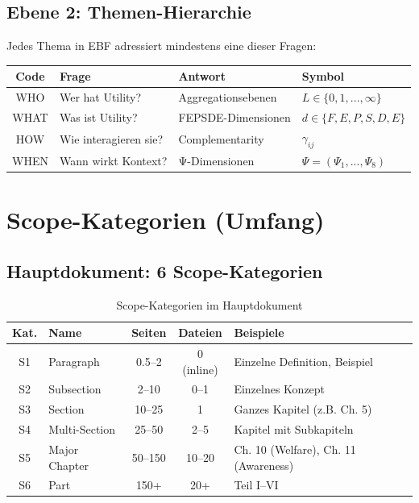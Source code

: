 \documentclass[12pt,a4paper]{article}
\begin{document}
\subsection{Ebene 2: Themen-Hierarchie}

\begin{tcolorbox}[colback=gray!5!white, colframe=gray!75!black, 
    title=Die 4 fundamentalen Fragen]

Jedes Thema in EBF adressiert mindestens eine dieser Fragen:

\begin{center}
\renewcommand{\arraystretch}{1.5}
\begin{tabular}{@{}clll@{}}
\toprule
\textbf{Code} & \textbf{Frage} & \textbf{Antwort} & \textbf{Symbol} \\
\midrule
WHO & Wer hat Utility? & Aggregationsebenen & $L \in \{0,1,...,\infty\}$ \\
WHAT & Was ist Utility? & FEPSDE-Dimensionen & $d \in \{F,E,P,S,D,E\}$ \\
HOW & Wie interagieren sie? & Complementarity & $\gamma_{ij}$ \\
WHEN & Wann wirkt Kontext? & Ψ-Dimensionen & $\Psi = (\Psi_1,...,\Psi_8)$ \\
\bottomrule
\end{tabular}
\end{center}

\end{tcolorbox}

\section{Scope-Kategorien (Umfang)}

\subsection{Hauptdokument: 6 Scope-Kategorien}

\begin{table}[htbp]
\centering
\caption{Scope-Kategorien im Hauptdokument}
\renewcommand{\arraystretch}{1.3}
\begin{tabular}{@{}clccp{5cm}@{}}
\toprule
\textbf{Kat.} & \textbf{Name} & \textbf{Seiten} & \textbf{Dateien} & \textbf{Beispiele} \\
\midrule
S1 & Paragraph & 0.5--2 & 0 (inline) & Einzelne Definition, Beispiel \\
S2 & Subsection & 2--10 & 0--1 & Einzelnes Konzept \\
S3 & Section & 10--25 & 1 & Ganzes Kapitel (z.B. Ch. 5) \\
S4 & Multi-Section & 25--50 & 2--5 & Kapitel mit Subkapiteln \\
S5 & Major Chapter & 50--150 & 10--20 & Ch. 10 (Welfare), Ch. 11 (Awareness) \\
S6 & Part & 150+ & 20+ & Teil I--VI \\
\bottomrule
\end{tabular}
\end{table}
\end{document}
